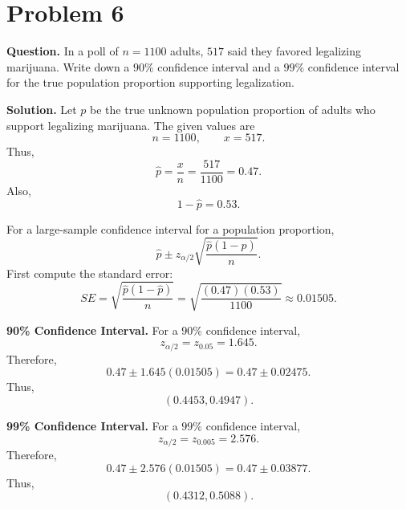 \documentclass[11pt]{article}
\begin{document}
\section*{Problem 6}

\textbf{Question.} In a poll of $n=1100$ adults, $517$ said they favored legalizing marijuana. Write down a $90\%$ confidence interval and a $99\%$ confidence interval for the true population proportion supporting legalization.

\textbf{Solution.} Let $p$ be the true unknown population proportion of adults who support legalizing marijuana. The given values are
\[
n=1100, \qquad x=517.
\]
Thus,
\[
\hat p=\frac{x}{n}=\frac{517}{1100}=0.47.
\]
Also,
\[
1-\hat p=0.53.
\]

For a large-sample confidence interval for a population proportion,
\[
\hat p\pm z_{\alpha/2}\sqrt{\frac{\hat p(1-\hat p)}{n}}.
\]
First compute the standard error:
\[
SE=\sqrt{\frac{\hat p(1-\hat p)}{n}}=\sqrt{\frac{(0.47)(0.53)}{1100}}\approx 0.01505.
\]

\textbf{90\% Confidence Interval.} For a $90\%$ confidence interval,
\[
z_{\alpha/2}=z_{0.05}=1.645.
\]
Therefore,
\[
0.47\pm 1.645(0.01505)=0.47\pm 0.02475.
\]
Thus,
\[
\boxed{(0.4453,0.4947)}.
\]

\textbf{99\% Confidence Interval.} For a $99\%$ confidence interval,
\[
z_{\alpha/2}=z_{0.005}=2.576.
\]
Therefore,
\[
0.47\pm 2.576(0.01505)=0.47\pm 0.03877.
\]
Thus,
\[
\boxed{(0.4312,0.5088)}.
\]

\newpage
\end{document}
